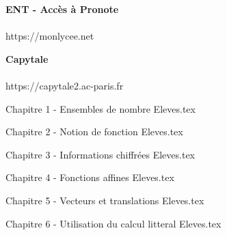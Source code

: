 \documentclass[11pt,a4paper,twoside,openany]{book}
\numberwithin{dummy}{section}
\theoremstyle{ocrenumboxTh}
\theoremstyle{ocrenumboxExercice}
\theoremstyle{ocrenumboxExercice}
\theoremstyle{ocrenumboxEx}
\theoremstyle{ocrenumboxEx}
\theoremstyle{ocrenumboxTh}
\theoremstyle{ocrenumboxTh*}
\theoremstyle{ocrenumboxTh}
\theoremstyle{ocrenumboxTh*}
\theoremstyle{ocrenumboxCoro}
\theoremstyle{ocrenumboxCoro*}
\theoremstyle{ocrenumboxCoro}
\theoremstyle{ocrenumboxCoro*}
\theoremstyle{ocrenumboxProp}
\theoremstyle{ocrenumboxProp*}
\theoremstyle{ocrenumboxProp}
\theoremstyle{ocrenumboxProp*}
\theoremstyle{ocrenumboxMéthode}
\theoremstyle{ocrenumboxMéthode}
\theoremstyle{ocrenumboxDef}
\theoremstyle{ocrenumboxDef*}
\theoremstyle{ocrenumboxDef}
\theoremstyle{ocrenumboxDef*}
\theoremstyle{ocrenumboxReg}
\theoremstyle{ocrenumboxReg*}
\theoremstyle{ocrenumboxReg}
\theoremstyle{ocrenumboxReg*}
\theoremstyle{ocrenumboxVoc}
\theoremstyle{ocrenumboxVoc}
\theoremstyle{ocrenumboxNot}
\theoremstyle{ocrenumboxNot}
\theoremstyle{ocrenumboxNot*}
\theoremstyle{ocrenumboxNot*}
\theoremstyle{ocrenum}
\begin{document}
\begin{minipage}[c]{0.5\linewidth}
   \begin{center}
\textbf{\textcolor{Couleur8}{ENT - Accès à Pronote}}\\
\vspace{5mm}
\\
\vspace{5mm}
\textcolor{Couleur6}{https://monlycee.net}\\
\end{center}
\end{minipage}
\hfill
\begin{minipage}[c]{0.3\linewidth}
     \begin{center}
\textbf{\textcolor{Couleur8}{Capytale}}\\
\vspace{5mm}
\\
\vspace{5mm}
\textcolor{Couleur6}{https://capytale2.ac-paris.fr}\\
\end{center}  
      \end{minipage}
      
      \vfill
      



\newpage



\setcounter{tocdepth}{1}
\tableofcontents


\newpage
\cleardoublepage
{Chapitre 1 - Ensembles de nombre Eleves.tex}

\cleardoublepage
{Chapitre 2 - Notion de fonction Eleves.tex}

\cleardoublepage
{Chapitre 3 - Informations chiffrées Eleves.tex}

\cleardoublepage
{Chapitre 4 - Fonctions affines Eleves.tex}

\cleardoublepage
{Chapitre 5 - Vecteurs et translations Eleves.tex}

\cleardoublepage
{Chapitre 6 - Utilisation du calcul litteral Eleves.tex}
\end{document}
